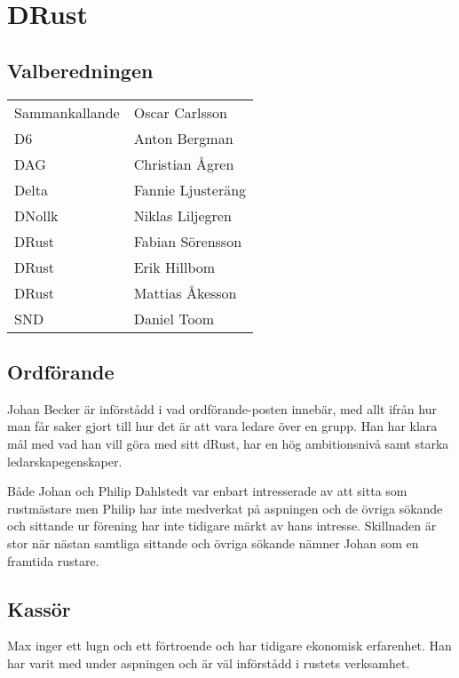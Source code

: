 \section{DRust}

\subsection{Valberedningen}
\begin{autoframe}

\begin{tabular}{ll}
Sammankallande & Oscar Carlsson \\
D6 & Anton Bergman \\
DAG  & Christian Ågren \\
Delta  & Fannie Ljusteräng \\
DNollk & Niklas Liljegren \\
DRust & Fabian Sörensson \\
DRust & Erik Hillbom \\
DRust & Mattias Åkesson \\
SND  & Daniel Toom
\end{tabular}

\end{autoframe}


\subsection{Ordförande}
\begin{autoframe}

Johan Becker är införstådd i vad ordförande-posten innebär, med allt ifrån hur man får saker gjort till hur det är att vara ledare över en grupp.  Han har klara mål med vad han vill göra med sitt dRust, har en hög ambitionsnivå samt starka ledarskapegenskaper.

\bigskip
Både Johan och Philip Dahlstedt var enbart intresserade av att sitta som rustmästare men Philip har inte medverkat på aspningen och de övriga sökande och sittande ur förening har inte tidigare märkt av hans intresse. Skillnaden är stor när nästan samtliga sittande och övriga sökande nämner Johan som en framtida rustare.
\end{autoframe}

\subsection{Kassör}
\begin{autoframe}

Max inger ett lugn och ett förtroende och har tidigare ekonomisk erfarenhet. Han har varit med under aspningen och är väl införstådd i rustets verksamhet.
\end{autoframe}

